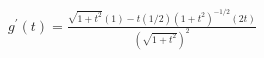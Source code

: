 $ \displaystyle g^{\prime}(t) = \frac{\sqrt{1 + t^2}(1) - t (1/2)(1+t^2)^{-1/2}(2t)}{(\sqrt{1 + t^2})^2} $